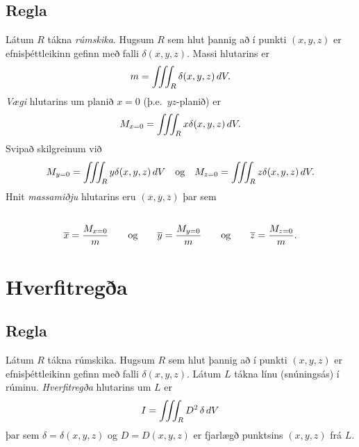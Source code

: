 \documentclass[a4paper,10pt,icelandic]{sphinxmanual}
\begin{document}
\subsection{Regla}
\label{Kafli4:id23}
Látum \(R\) tákna \textit{rúmskika}. Hugsum \(R\) sem hlut þannig að í
punkti \((x,y,z)\) er efnisþéttleikinn gefinn með falli
\(\delta(x,y,z)\). Massi hlutarins er
\begin{gather}
\begin{split}\displaystyle m=\int\!\!\!\int\!\!\!\int_R \delta(x,y,z)\,dV.\end{split}\notag
\end{gather}
\emph{Vægi} hlutarins um planið \(x=0\) (þ.e. \(yz\)-planið) er
\begin{gather}
\begin{split}\displaystyle M_{x=0}=\int\!\!\!\int\!\!\!\int_R x\delta(x,y,z)\,dV.\end{split}\notag
\end{gather}
Svipað skilgreinum við
\begin{gather}
\begin{split}\displaystyle M_{y=0}=\int\!\!\!\int\!\!\!\int_R y\delta(x,y,z)\,dV \quad \text{og}\quad M_{z=0}=\int\!\!\!\int\!\!\!\int_R z\delta(x,y,z)\,dV.\end{split}\notag
\end{gather}
Hnit \emph{massamiðju} hlutarins eru
\((\overline{x}, \overline{y}, \overline{z})\) þar sem
\begin{gather}
\begin{split}\displaystyle\end{split}\notag\\\begin{split}\overline{x}=\frac{M_{x=0}}{m}
\qquad\mbox{og}\qquad
\overline{y}=\frac{M_{y=0}}{m}
\qquad\mbox{og}\qquad
\overline{z}=\frac{M_{z=0}}{m}.\end{split}\notag
\end{gather}

\section{Hverfitregða}
\label{Kafli4:hverfitrega}\label{Kafli4:index-17}

\subsection{Regla}
\label{Kafli4:id24}
Látum \(R\) tákna rúmskika. Hugsum \(R\) sem hlut þannig að í
punkti \((x,y,z)\) er efnisþéttleikinn gefinn með falli
\(\delta(x,y,z)\). Látum \(L\) tákna línu (snúningsás) í rúminu.
\emph{Hverfitregða} hlutarins um \(L\) er
\begin{gather}
\begin{split}\displaystyle I=\int\!\!\!\int\!\!\!\int_R D^2 \,\delta\,dV\end{split}\notag
\end{gather}
þar sem \(\delta=\delta(x,y,z)\) og \(D=D(x,y,z)\) er fjarlægð
punktsins \((x,y,z)\) frá \(L\).
\end{document}
